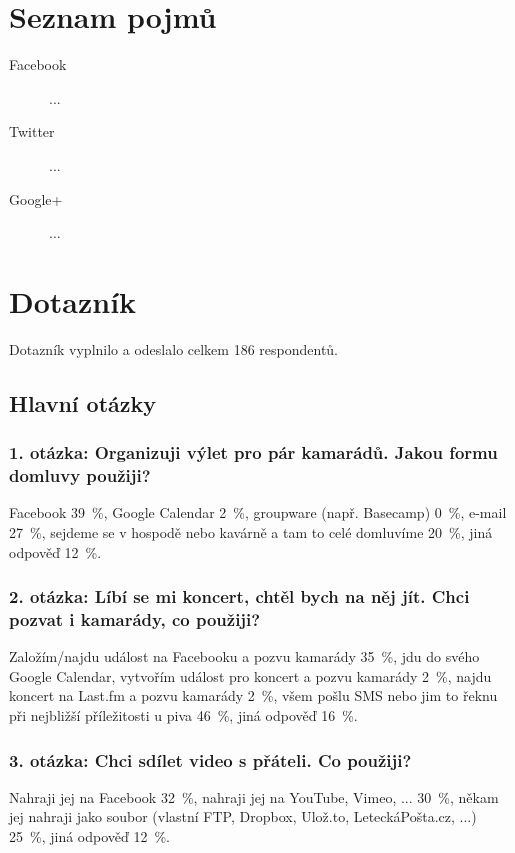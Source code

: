 \documentclass[12pt,oneside,final]{fithesis2}
\begin{document}
\chapter{Seznam pojmů}\label{terms}

\begin{description}
    \item[Facebook] ...
    \item[Twitter] ...
    \item[Google+] ...
\end{description}



\chapter{Dotazník}\label{pollAppendix}
Dotazník vyplnilo a odeslalo celkem 186 respondentů.

\section{Hlavní otázky}

\subsection*{1. otázka: Organizuji výlet pro pár kamarádů. Jakou formu domluvy použiji?}
Facebook 39~\%,
Google Calendar 2~\%,
groupware (např. Basecamp) 0~\%,
e-mail 27~\%,
sejdeme se v hospodě nebo kavárně a tam to celé domluvíme 20~\%,
jiná odpověď 12~\%.

\subsection*{2. otázka: Líbí se mi koncert, chtěl bych na něj jít. Chci pozvat i kamarády, co použiji?}
Založím/najdu událost na Facebooku a pozvu kamarády 35~\%,
jdu do svého Google Calendar, vytvořím událost pro koncert a pozvu kamarády  2~\%,
najdu koncert na Last.fm a pozvu kamarády  2~\%,
všem pošlu SMS nebo jim to řeknu při nejbližší příležitosti u piva 46~\%,
jiná odpověď 16~\%.

\subsection*{3. otázka: Chci sdílet video s přáteli. Co použiji?}
Nahraji jej na Facebook 32~\%,
nahraji jej na YouTube, Vimeo, ... 30~\%,
někam jej nahraji jako soubor (vlastní FTP, Dropbox, Ulož.to, LeteckáPošta.cz, ...) 25~\%,
jiná odpověď 12~\%.
\end{document}
